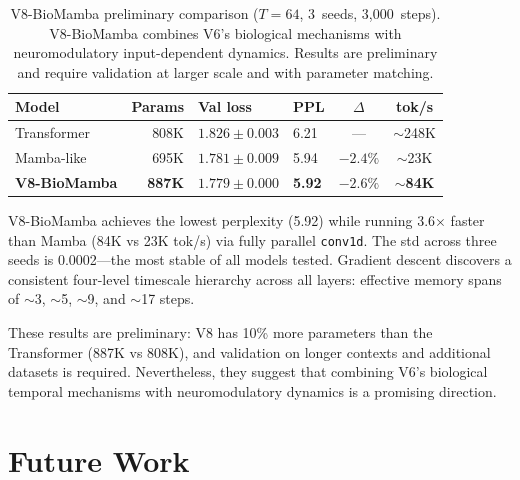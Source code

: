 \documentclass[11pt,a4paper]{article}
\begin{document}
\begin{table}[t]
\centering
\caption{%
V8-BioMamba preliminary comparison ($T=64$, 3~seeds, 3,000~steps).
V8-BioMamba combines V6's biological mechanisms with neuromodulatory
input-dependent dynamics. Results are preliminary and require validation
at larger scale and with parameter matching.%
}
\label{tab:v8}
\begin{tabular}{@{}lrllcc@{}}
\toprule
Model & Params & Val loss & PPL & $\Delta$ & tok/s \\
\midrule
Transformer       & 808K & $1.826\pm0.003$ & 6.21 & ---      & $\sim$248K \\
Mamba-like         & 695K & $1.781\pm0.009$ & 5.94 & $-2.4\%$ & $\sim$23K \\
\textbf{V8-BioMamba} & \textbf{887K} & $\mathbf{1.779\pm0.000}$ & \textbf{5.92} & $\mathbf{-2.6\%}$ & $\sim$\textbf{84K} \\
\bottomrule
\end{tabular}
\end{table}

V8-BioMamba achieves the lowest perplexity (5.92) while running
3.6$\times$ faster than Mamba (84K vs 23K tok/s) via fully parallel
\texttt{conv1d}. The std across three seeds is 0.0002---the most
stable of all models tested.
Gradient descent discovers a consistent four-level timescale hierarchy
across all layers: effective memory spans of $\sim$3, $\sim$5, $\sim$9,
and $\sim$17 steps.

These results are preliminary: V8 has 10\% more parameters than the
Transformer (887K vs 808K), and validation on longer contexts and
additional datasets is required. Nevertheless, they suggest that
combining V6's biological temporal mechanisms with neuromodulatory
dynamics is a promising direction.

\section{Future Work}
\label{sec:future}
\end{document}

